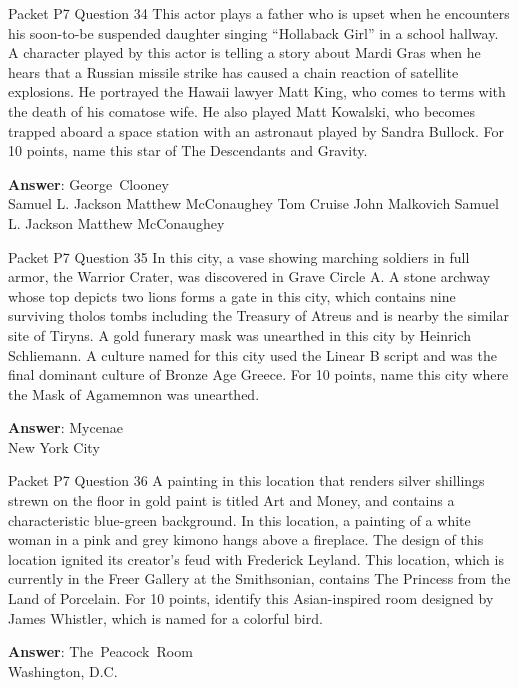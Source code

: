 \begin{frame}{Packet P7 Question 34}
This actor plays a father   who is upset when he encounters his soon-to-be suspended daughter singing “Hollaback Girl” in a school hallway. A character played by this actor is telling a story about Mardi Gras when he hears that a Russian missile strike has caused a chain reaction of satellite explosions. He portrayed the Hawaii lawyer Matt King, who comes to terms with the death of his comatose wife. He also played Matt Kowalski, who becomes trapped aboard a space station with an astronaut played by   Sandra Bullock. For 10 points, name this star of The Descendants and Gravity.        

\textbf{Answer}: George\ Clooney\\
 Samuel L. Jackson
 Matthew McConaughey
 Tom Cruise
 John Malkovich
 Samuel L. Jackson
 Matthew McConaughey
\end{frame}

\begin{frame}{Packet P7 Question 35}
In this city, a vase showing marching soldiers in full armor, the Warrior Crater, was discovered in Grave Circle A. A stone archway whose top depicts two lions forms a gate in this city, which contains nine surviving tholos tombs including the   Treasury of Atreus and is nearby the similar site of Tiryns.   A gold funerary mask was unearthed in this city by Heinrich Schliemann. A culture   named for this city used the Linear B script and was the final dominant culture of Bronze Age Greece. For 10 points, name this city where the Mask of Agamemnon was unearthed.  

\textbf{Answer}: Mycenae\\
 New York City
\end{frame}

\begin{frame}{Packet P7 Question 36}
A painting in this location that renders silver shillings strewn on the floor in gold paint is titled Art and Money, and contains   a characteristic blue-green background. In this location, a painting of a white woman in a pink and grey kimono hangs above a fireplace. The design of this location ignited its creator’s feud with Frederick Leyland. This location, which   is currently in the Freer Gallery at the Smithsonian, contains The Princess from the Land of Porcelain. For 10 points,   identify this Asian-inspired room designed by James Whistler, which is named for a colorful bird.  

\textbf{Answer}: The\ Peacock\ Room\\
 Washington, D.C.
\end{frame}

